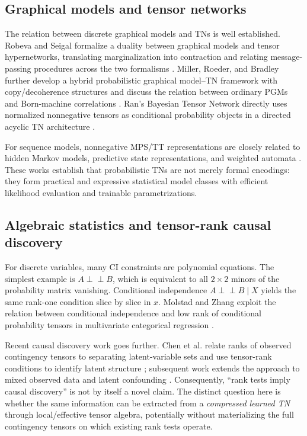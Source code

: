 \documentclass[11pt]{article}
\theoremstyle{remark}
\newcommand{\indep}{\perp\!\!\!\perp}
\begin{document}
\subsection{Graphical models and tensor networks}

The relation between discrete graphical models and TNs is well established. Robeva and Seigal formalize a duality between graphical models and tensor hypernetworks, translating marginalization into contraction and relating message-passing procedures across the two formalisms \cite{robeva2019duality}. Miller, Roeder, and Bradley further develop a hybrid probabilistic graphical model--TN framework with copy/decoherence structures and discuss the relation between ordinary PGMs and Born-machine correlations \cite{miller2021hybrid}. Ran's Bayesian Tensor Network directly uses normalized nonnegative tensors as conditional probability objects in a directed acyclic TN architecture \cite{ran2019bayesian}.

For sequence models, nonnegative MPS/TT representations are closely related to hidden Markov models, predictive state representations, and weighted automata \cite{glasser2019expressive,adhikary2021quantum}. These works establish that probabilistic TNs are not merely formal encodings: they form practical and expressive statistical model classes with efficient likelihood evaluation and trainable parametrizations.

\subsection{Algebraic statistics and tensor-rank causal discovery}

For discrete variables, many CI constraints are polynomial equations. The simplest example is $A\indep B$, which is equivalent to all $2\times 2$ minors of the probability matrix vanishing. Conditional independence $A\indep B\mid X$ yields the same rank-one condition slice by slice in $x$. Molstad and Zhang exploit the relation between conditional independence and low rank of conditional probability tensors in multivariate categorical regression \cite{molstad2026conditional}.

Recent causal discovery work goes further. Chen et al. relate ranks of observed contingency tensors to separating latent-variable sets and use tensor-rank conditions to identify latent structure \cite{chen2024tensor}; subsequent work extends the approach to mixed observed data and latent confounding \cite{chen2025latent}. Consequently, ``rank tests imply causal discovery'' is not by itself a novel claim. The distinct question here is whether the same information can be extracted from a \emph{compressed learned TN} through local/effective tensor algebra, potentially without materializing the full contingency tensors on which existing rank tests operate.
\end{document}
